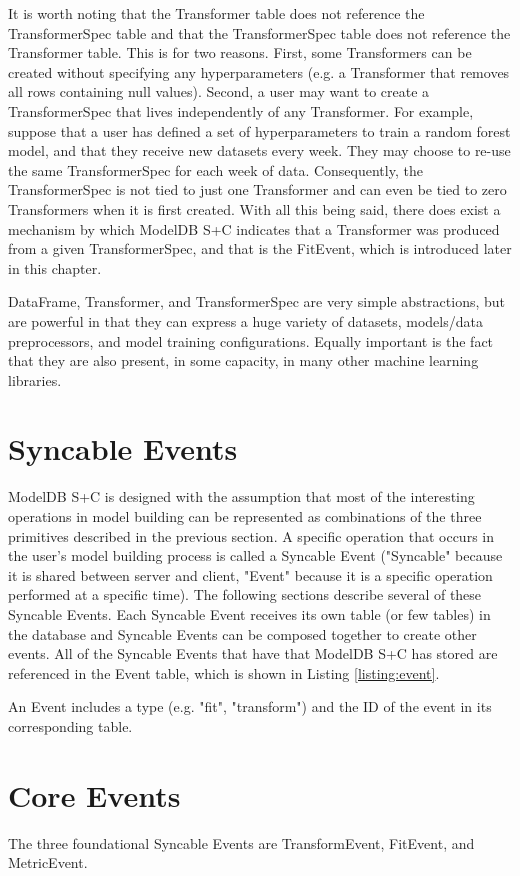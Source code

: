 It is worth noting that the Transformer table does not reference the TransformerSpec
table and that the TransformerSpec table does not reference the Transformer table. This
is for two reasons. First, some Transformers can be created without specifying any
hyperparameters (e.g. a Transformer that removes all rows containing null values). 
Second, a user may want to create a TransformerSpec that lives independently of any
Transformer. For example, suppose that a user has defined a set of hyperparameters to
train a random forest model, and that they receive new datasets every week. They may choose
to re-use the same TransformerSpec for each week of data. Consequently, the TransformerSpec is
not tied to just one Transformer and can even be tied to zero Transformers when it is first created. With
all this being said, there does exist a mechanism by which ModelDB S+C indicates that a Transformer
was produced from a given TransformerSpec, and that is the FitEvent, which is introduced later in
this chapter.

DataFrame, Transformer, and TransformerSpec are very simple abstractions, but are powerful in that
they can express a huge variety of datasets, models/data preprocessors, and model training configurations.
Equally important is the fact that they are also present, in some capacity, in many other machine learning
libraries.

\section{Syncable Events}
ModelDB S+C is designed with the assumption that most of the interesting operations in
model building can be represented as combinations of the three primitives described in the
previous section. A specific operation that occurs in the user's model building process
is called a Syncable Event ("Syncable" because it is shared between server and client, 
"Event" because it is a specific operation performed at a specific time). The following
sections describe several of these Syncable Events. Each Syncable Event receives its own
table (or few tables) in the database and Syncable Events can be composed together to
create other events. All of the Syncable Events that have that ModelDB S+C has stored
are referenced in the Event table, which is shown in Listing \ref{listing:event}.

An Event includes a type (e.g. "fit", "transform") and the ID of the event
in its corresponding table.

\section{Core Events}
The three foundational Syncable Events are TransformEvent, FitEvent, and MetricEvent.

